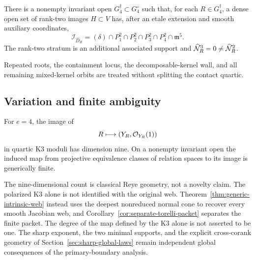 \begin{theorem}
\label{thm:main-coranktwo}
There is a nonempty invariant open
\(G_4^\dagger\subset G_4^\circ\) such that, for each
\(R\in G_4^\dagger\), a dense open set of rank-two images
\(H\subset V\) has, after an etale extension and smooth auxiliary
coordinates,
\begin{equation}\label{eq:main-coranktwo}
 \mathcal I_{\widehat D_R}
 =
 (\delta)\cap P_1^2\cap P_2^2\cap P_3^2\cap P_4^2
 \cap\mathfrak m^5.
\end{equation}
The rank-two stratum is an additional associated support and
\(\widehat{\mathcal N}_R^3=0\ne\widehat{\mathcal N}_R^2\).
\end{theorem}

Repeated roots, the containment locus, the decomposable-kernel wall,
and all remaining mixed-kernel orbits are treated without splitting
the contact quartic.


\subsection{Variation and finite ambiguity}

\begin{theorem}
\label{thm:main-moduli}
For \(e=4\), the image of
\[
 R\longmapsto(Y_R,\mathcal O_{Y_R}(1))
\]
in quartic K3 moduli has dimension nine.  On a nonempty invariant
open the induced map from projective equivalence classes of relation
spaces to its image is generically finite.
\end{theorem}

The nine-dimensional count is classical Reye geometry, not a novelty
claim.  The polarized K3 alone is not identified with the original web.
Theorem~\ref{thm:generic-intrinsic-web} instead uses the deepest
nonreduced normal cone to recover every smooth Jacobian web, and
Corollary~\ref{cor:separate-torelli-packet} separates the finite
packet.  The degree of the map defined by the K3 alone is not asserted
to be one.  The sharp exponent, the two minimal supports, and the
explicit cross-corank geometry of
Section~\ref{sec:sharp-global-laws} remain independent global
consequences of the primary-boundary analysis.


